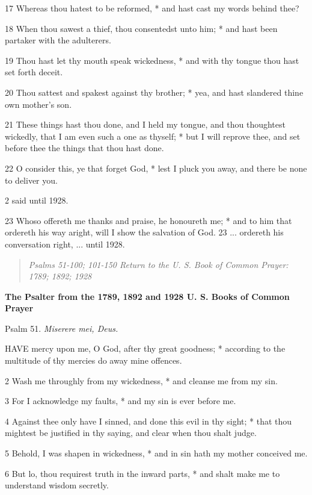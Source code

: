 17 Whereas thou hatest to be reformed, * and hast cast
my words behind thee?

18 When thou sawest a thief, thou consentedst unto him;
* and hast been partaker with the adulterers.

19 Thou hast let thy mouth speak wickedness, * and with
thy tongue thou hast set forth deceit.

20 Thou sattest and spakest against thy brother; * yea,
and hast slandered thine own mother's son.

21 These things hast thou done, and I held my tongue,
and thou thoughtest wickedly, that I am even such a one as thyself; * but
I will reprove thee, and set before thee the things that thou hast done.

22 O consider this, ye that forget God, * lest I pluck
you away, and there be none to deliver you.

2 said
until 1928.

23 Whoso offereth me thanks and praise, he honoureth
me; * and to him that ordereth his way aright, will I show the salvation
of God. 23 ... ordereth his conversation
right, ...
until 1928.

\begin{quote}

\emph{Psalms 51-100;
101-150 Return to the U. S. Book of Common Prayer: 1789;
1892; 1928}

\end{quote}


\textbf{The Psalter from the 1789, 1892 and 1928 U. S. Books of Common
Prayer}

Psalm 51. \emph{Miserere mei, Deus.}

HAVE mercy upon me, O God, after thy great
goodness; * according to the multitude of thy mercies do away mine offences.

2 Wash me throughly from my wickedness, * and cleanse
me from my sin.

3 For I acknowledge my faults, * and my sin is ever
before me.

4 Against thee only have I sinned, and done this evil
in thy sight; * that thou mightest be justified in thy saying, and clear
when thou shalt judge.

5 Behold, I was shapen in wickedness, * and in sin
hath my mother conceived me.

6 But lo, thou requirest truth in the inward parts,
* and shalt make me to understand wisdom secretly.

